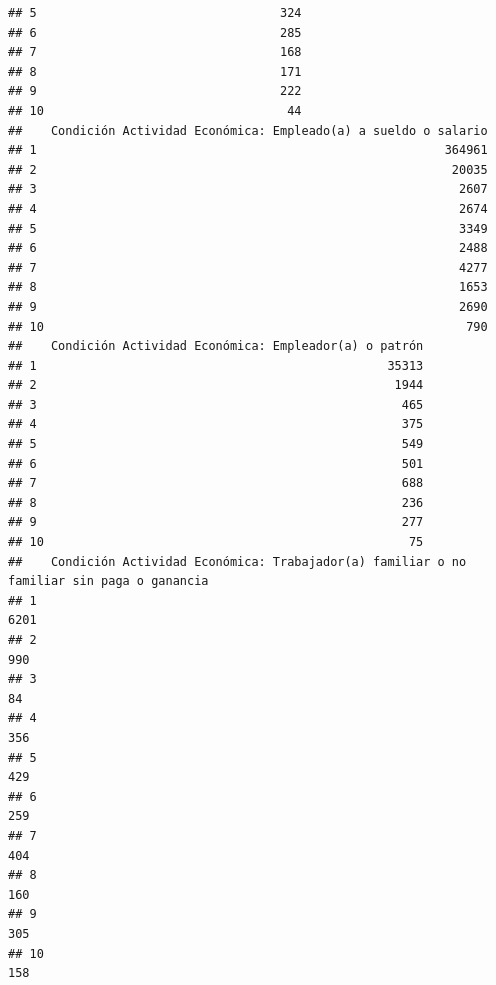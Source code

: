 \documentclass[11pt,]{article}
\begin{document}
\begin{verbatim}
## 5                                  324
## 6                                  285
## 7                                  168
## 8                                  171
## 9                                  222
## 10                                  44
##    Condición Actividad Económica: Empleado(a) a sueldo o salario
## 1                                                         364961
## 2                                                          20035
## 3                                                           2607
## 4                                                           2674
## 5                                                           3349
## 6                                                           2488
## 7                                                           4277
## 8                                                           1653
## 9                                                           2690
## 10                                                           790
##    Condición Actividad Económica: Empleador(a) o patrón
## 1                                                 35313
## 2                                                  1944
## 3                                                   465
## 4                                                   375
## 5                                                   549
## 6                                                   501
## 7                                                   688
## 8                                                   236
## 9                                                   277
## 10                                                   75
##    Condición Actividad Económica: Trabajador(a) familiar o no familiar sin paga o ganancia
## 1                                                                                     6201
## 2                                                                                      990
## 3                                                                                       84
## 4                                                                                      356
## 5                                                                                      429
## 6                                                                                      259
## 7                                                                                      404
## 8                                                                                      160
## 9                                                                                      305
## 10                                                                                     158

\end{verbatim}
\end{document}
